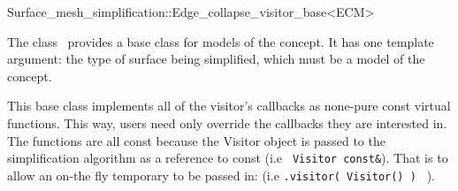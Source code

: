 
\begin{ccRefClass}{Surface_mesh_simplification::Edge_collapse_visitor_base<ECM>}


\ccDefinition

The class \ccRefName\ provides a base class for models of the  concept.
It has one template argument: the type of surface being simplified,
which must be a model of the  concept.

This base class implements all of the visitor's callbacks as none-pure const virtual functions. 
This way, users need only override the callbacks they are interested in.
The functions are all const because the Visitor object is passed to the simplification algorithm as 
a reference to const (i.e \texttt{ Visitor const&}). 
That is to allow an on-the fly temporary to be passed in:  (i.e \texttt{.visitor( Visitor() ) } ).


\ccIsModel
{}

  
\end{ccRefClass}

